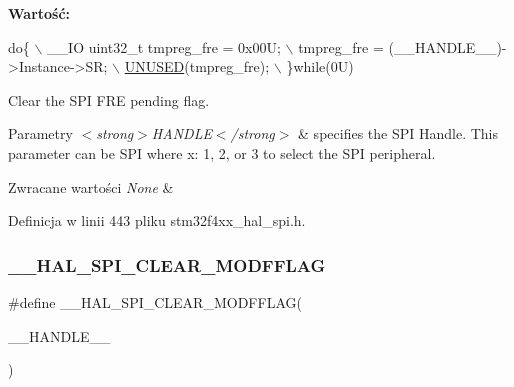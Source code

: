 {\bfseries Wartość\+:}
\begin{DoxyCode}
\textcolor{keywordflow}{do}\{                                              \(\backslash\)
    \_\_IO uint32\_t tmpreg\_fre = 0x00U;              \(\backslash\)
    tmpreg\_fre = (\_\_HANDLE\_\_)->Instance->SR;       \(\backslash\)
    \hyperlink{stm32f4xx__hal__def_8h_a6bc306171da085f4c7df2c66d2ff8e47}{UNUSED}(tmpreg\_fre);                            \(\backslash\)
  \}\textcolor{keywordflow}{while}(0U)
\end{DoxyCode}


Clear the S\+PI F\+RE pending flag. 


\begin{DoxyParams}{Parametry}
{\em $<$strong$>$\+H\+A\+N\+D\+L\+E$<$/strong$>$} & specifies the S\+PI Handle. This parameter can be S\+PI where x\+: 1, 2, or 3 to select the S\+PI peripheral. \\
\hline
\end{DoxyParams}

\begin{DoxyRetVals}{Zwracane wartości}
{\em None} & \\
\hline
\end{DoxyRetVals}


Definicja w linii 443 pliku stm32f4xx\+\_\+hal\+\_\+spi.\+h.

\mbox{\label{group___s_p_i___exported___macros_ga6c88becbe528c542156bc201622efba2}} 
\subsubsection{\texorpdfstring{\+\_\+\+\_\+\+H\+A\+L\+\_\+\+S\+P\+I\+\_\+\+C\+L\+E\+A\+R\+\_\+\+M\+O\+D\+F\+F\+L\+AG}{\_\_HAL\_SPI\_CLEAR\_MODFFLAG}}
{\footnotesize\ttfamily \#define \+\_\+\+\_\+\+H\+A\+L\+\_\+\+S\+P\+I\+\_\+\+C\+L\+E\+A\+R\+\_\+\+M\+O\+D\+F\+F\+L\+AG(\begin{DoxyParamCaption}\item[{}]{\+\_\+\+\_\+\+H\+A\+N\+D\+L\+E\+\_\+\+\_\+ }\end{DoxyParamCaption})}

